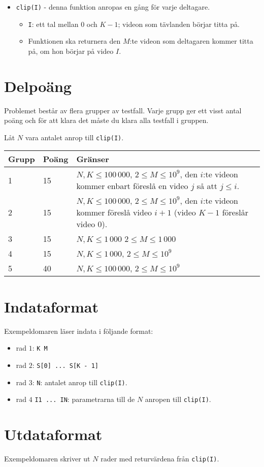 \begin{itemize}
  \item \texttt{clip(I)} - denna funktion anropas en gång för varje deltagare.
  \begin{itemize}
    \item \texttt{I}: ett tal mellan $0$ och $K - 1$; videon som tävlanden börjar titta på.
		\item Funktionen ska returnera den $M$:te videon som deltagaren kommer titta på, om hon börjar på video $I$.
  \end{itemize}
\end{itemize}

\section*{Delpoäng}
Problemet består av flera grupper av testfall. Varje grupp ger ett visst antal poäng och för att klara det måste du klara alla testfall i gruppen.

Låt $N$ vara antalet anrop till \texttt{clip(I)}.
\begin{tabular}{|l|l|l|}
  \hline
  \textbf{Grupp} & \textbf{Poäng} & \textbf{Gränser} \\ \hline
  1 & 15 & $N, K \le 100\,000$, $2 \le M \le 10^9$, den $i$:te videon kommer enbart föreslå en video $j$ så att $j \le i$. \\ \hline
  2 & 15 & $N, K \le 100\,000$, $2 \le M \le 10^9$, den $i$:te videon kommer föreslå video $i + 1$ (video $K - 1$ föreslår video 0). \\ \hline
  3 & 15 & $N, K \le 1\,000$ $2 \le M \le 1\,000$ \\ \hline
  4 & 15 & $N, K \le 1\,000$, $2 \le M \le 10^9$ \\ \hline
  5 & 40 & $N, K \le 100\,000$, $2 \le M \le 10^9$ \\ \hline
\end{tabular}

\section*{Indataformat}
Exempeldomaren läser indata i följande format:

\begin{itemize}
  \item rad $1$: \texttt{K M}
  \item rad $2$: \texttt{S[0] ... S[K - 1]}
  \item rad $3$: \texttt{N}: antalet anrop till \texttt{clip(I)}.
  \item rad $4$ \texttt{I1 ... IN}: parametrarna till de $N$ anropen till \texttt{clip(I)}.
\end{itemize}

\section*{Utdataformat}
Exempeldomaren skriver ut $N$ rader med returvärdena från \texttt{clip(I)}.
